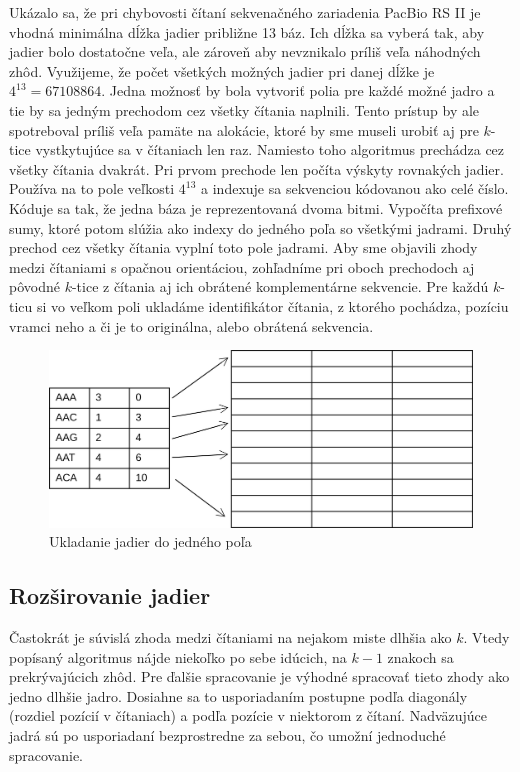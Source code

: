 Ukázalo sa, že pri chybovosti čítaní sekvenačného zariadenia PacBio RS II je vhodná minimálna dĺžka jadier približne 13 báz. Ich dĺžka sa vyberá tak, aby jadier bolo dostatočne veľa, ale zároveň aby nevznikalo príliš veľa náhodných zhôd. Využijeme, že počet všetkých možných jadier pri danej dĺžke je $4^{13} = 67108864$. Jedna možnosť by bola vytvoriť polia pre každé možné jadro a tie by sa jedným prechodom cez všetky čítania naplnili. Tento prístup by ale spotreboval príliš veľa pamäte na alokácie, ktoré by sme museli urobiť aj pre $k$-tice vystkytujúce sa v čítaniach len raz. Namiesto toho algoritmus prechádza cez všetky čítania dvakrát. Pri prvom prechode len počíta výskyty rovnakých jadier. Používa na to pole veľkosti $4^{13}$ a indexuje sa sekvenciou kódovanou ako celé číslo. Kóduje sa tak, že jedna báza je reprezentovaná dvoma bitmi. Vypočíta prefixové sumy, ktoré potom slúžia ako indexy do jedného poľa so všetkými jadrami. Druhý prechod cez všetky čítania vyplní toto pole jadrami. Aby sme objavili zhody medzi čítaniami s opačnou orientáciou, zohľadníme pri oboch prechodoch aj pôvodné $k$-tice z čítania aj ich obrátené komplementárne sekvencie. Pre každú $k$-ticu si vo veľkom poli ukladáme identifikátor čítania, z ktorého pochádza, pozíciu vramci neho a či je to originálna, alebo obrátená sekvencia. 

\begin{figure}
    \centering
    \includegraphics[width=1\textwidth]{images/jadra_velke_pole.png}
    \caption{Ukladanie jadier do jedného poľa}
    \label{fig:velke_pole}
\end{figure} 

\subsection{Rozširovanie jadier}

Častokrát je súvislá zhoda medzi čítaniami na nejakom miste dlhšia ako $k$. Vtedy popísaný algoritmus nájde niekoľko po sebe idúcich, na $k - 1$ znakoch sa prekrývajúcich zhôd. Pre ďalšie spracovanie je výhodné spracovať tieto zhody ako jedno dlhšie jadro. Dosiahne sa to usporiadaním postupne podľa diagonály (rozdiel pozícií v čítaniach) a podľa pozície v niektorom z čítaní. Nadväzujúce jadrá sú po usporiadaní bezprostredne za sebou, čo umožní jednoduché spracovanie.

